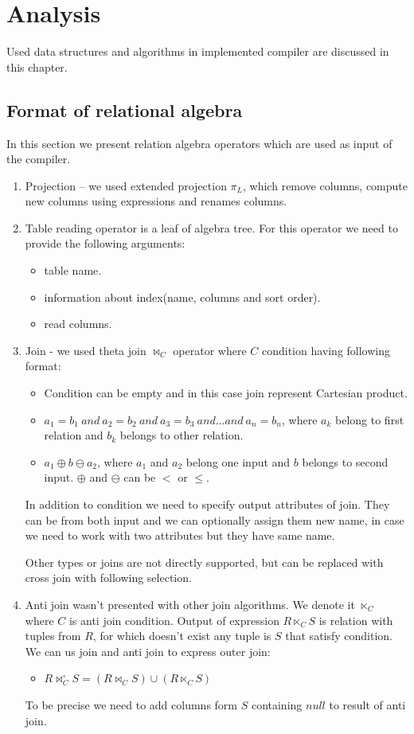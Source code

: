 \chapter{Analysis}
Used data structures and algorithms in implemented compiler are discussed in this chapter.
\section{Format of relational algebra}

In this section we present relation algebra operators which are used as input of the compiler.
\begin{enumerate}
\item Projection -- we used extended projection $\pi_L$, which remove columns, compute new columns using expressions and renames columns.

\item Table reading operator is a leaf of algebra tree. For this operator we need to provide the following arguments:
\begin{itemize}
\item table name.
\item information about index(name, columns and sort order).
\item read columns.
\end{itemize}
\item Join - we used theta join $\Join_C$ operator where $C$ condition having following format:
\begin{itemize}
\item Condition can be empty and in this case join represent Cartesian product.
\item $a_1=b_1~and~a_2=b_2~and~a_3=b_3~and...and~a_n=b_n$, where $a_k$ belong to first relation and $b_k$ belongs to other relation.
\item $a_1\oplus b \ominus a_2$, where $a_1$ and $a_2$ belong one input and $b$ belongs to second input. $\oplus$ and $\ominus$ can be $<$ or $\leq$.

\end{itemize}

In addition to condition we need to specify output attributes of join. They can be from both input and we can optionally assign them new name, in case we need to work with two attributes but they have same name.

Other types or joins are not directly supported, but can be replaced with cross join with following selection.
\item Anti join wasn't presented with other join algorithms. We denote it $\ltimes_C$ where $C$ is anti join condition. Output of expression $R \ltimes_C S$ is relation with tuples from $R$, for which doesn't exist any tuple is $S$ that satisfy condition. We can us join and anti join to express outer join:
\begin{itemize}
\item 
 $R\Join^\circ_C S= (R\Join_C S)\cup (R\ltimes_C S)$
\end{itemize}
To be precise we need to add columns form $S$ containing $null$ to result of anti join.
 

\end{enumerate}
